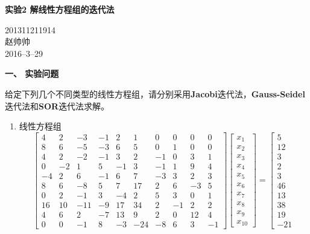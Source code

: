 \documentclass[a4paper,11pt]{article}
\begin{document}
\begin{center}
	\huge{\textbf{实验2 解线性方程组的迭代法\\}}
\end{center}
\begin{flushright}
	201311211914\\
	赵帅帅\\
	2016--3--29\\
\end{flushright}
\begin{Large}
	\textbf{一、 实验问题}
\end{Large}

	给定下列几个不同类型的线性方程组，请分别采用\textbf{Jacobi}迭代法，\textbf{Gauss-Seidel}迭代法和\textbf{SOR}迭代法求解。
\begin{enumerate}
	\item 线性方程组
	\begin{displaymath} %
		\left[
		\begin{array}{cccccccccc}
			4 & 2 & -3 & -1 & 2 & 1 & 0 & 0 & 0 & 0\\
		    8 & 6 & -5 & -3 & 6 & 5 & 0 & 1 & 0 & 0\\
		    4 & 2 & -2 & -1 & 3 & 2 & -1 & 0 & 3 & 1\\
		    0 & -2 & 1 & 5 & -1 & 3 & -1 & 1 & 9 & 4\\
		    -4 & 2 & 6 & -1 & 6 & 7 & -3 & 3 & 2 & 3\\
		    8 & 6 & -8 & 5 & 7 & 17 & 2 & 6 & -3 & 5\\
		    0 & 2 & -1 & 3 & -4 & 2 & 5 & 3 & 0 & 1\\
		    16 & 10 & -11 & -9 & 17 & 34 & 2 & -1 & 2 & 2\\
		    4 & 6 & 2 & -7 & 13 & 9 & 2 & 0 & 12 & 4\\
		    0 & 0 & -1 & 8 & -3 & -24 & -8 & 6 & 3 & -1
		\end{array}
		\right]
		\left[
		\begin{array}{c}
			x_1\\x_2\\x_3\\x_4\\x_5\\x_6\\x_7\\x_8\\x_9\\x_{10}
		\end{array}
		\right]
		=
		\left[
		\begin{array}{c}
			5\\ 12\\ 3\\ 2\\ 3\\ 46\\ 13\\ 38\\ 19\\ -21

\end{array}
\end{displaymath}
\end{enumerate}
\end{document}

